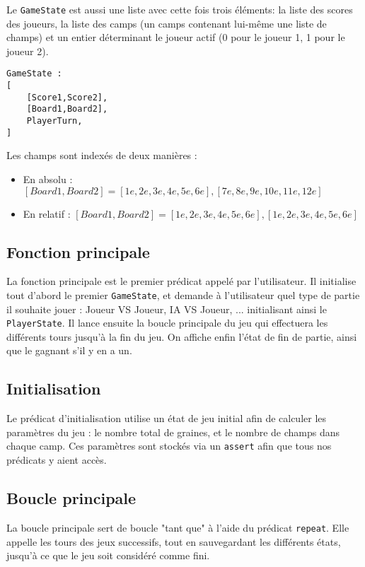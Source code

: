 \documentclass[]{article}
\begin{document}
Le \texttt{GameState} est aussi une liste avec cette fois trois éléments: la liste des scores des joueurs, la liste des camps (un camps contenant lui-même une liste de champs) et un entier déterminant le joueur actif (0 pour le joueur 1, 1 pour le joueur 2).
\begin{verbatim}
GameState :
[
    [Score1,Score2],
    [Board1,Board2],
    PlayerTurn, 
]
\end{verbatim}

Les champs sont indexés de deux manières : 
\begin{itemize}
\item En absolu : $[Board1,Board2] = [1e,2e,3e,4e,5e,6e],[7e,8e,9e,10e,11e,12e]$
\item En relatif : $[Board1,Board2] = [1e,2e,3e,4e,5e,6e],[1e,2e,3e,4e,5e,6e]$
\end{itemize}

\subsection{Fonction principale}

La fonction principale est le premier prédicat appelé par l'utilisateur. Il initialise tout d'abord le premier \texttt{GameState}, et demande à l'utilisateur quel type de partie il souhaite jouer : Joueur VS Joueur, IA VS Joueur, ... initialisant ainsi le \texttt{PlayerState}. Il lance ensuite la boucle principale du jeu qui effectuera les différents tours jusqu'à la fin du jeu. On affiche enfin l'état de fin de partie, ainsi que le gagnant s'il y en a un.

\subsection{Initialisation}

Le prédicat d'initialisation utilise un état de jeu initial afin de calculer les paramètres du jeu : le nombre total de graines, et le nombre de champs dans chaque camp. Ces paramètres sont stockés via un \texttt{assert} afin que tous nos prédicats y aient accès.

\subsection{Boucle principale}

La boucle principale sert de boucle "tant que" à l'aide du prédicat \texttt{repeat}. Elle appelle les tours des jeux successifs, tout en sauvegardant les différents états, jusqu'à ce que le jeu soit considéré comme fini.
\end{document}
